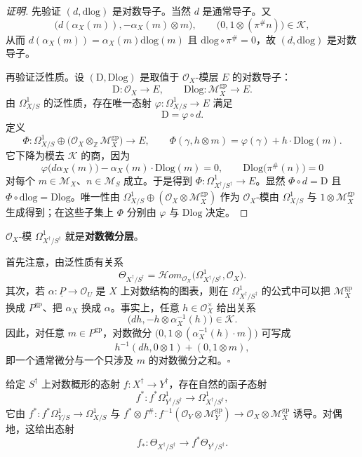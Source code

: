 \begin{proof}[证明]
先验证 $(d,\mathrm{dlog})$ 是对数导子。当然 $d$ 是通常导子。又
\[
  \bigl(d(\alpha_X(m)),-\alpha_X(m)\otimes m\bigr),\qquad
  \bigl(0,1\otimes(\pi^{\#}n)\bigr)\in\mathcal{K},
\]
从而 $d(\alpha_X(m))=\alpha_X(m)\mathrm{dlog}(m)$ 且 $\mathrm{dlog}\circ\pi^{\#}=0$，故 $(d,\mathrm{dlog})$ 是对数导子。

再验证泛性质。设 $(\mathrm{D},\mathrm{Dlog})$ 是取值于 $\mathcal{O}_X$-模层 $E$ 的对数导子：
\[
  \mathrm{D}:\mathcal{O}_X\longrightarrow E,\qquad
  \mathrm{Dlog}:\mathcal{M}_X^{\mathrm{gp}}\longrightarrow E.
\]
由 $\Omega^1_{X/S}$ 的泛性质，存在唯一态射 $\varphi:\Omega^1_{X/S}\to E$ 满足
\[
  \mathrm{D}=\varphi\circ d.
\]
定义
\[
  \Phi:\Omega^1_{X/S}\oplus\bigl(\mathcal{O}_X\otimes_{\mathbb{Z}}\mathcal{M}_X^{\mathrm{gp}}\bigr)
  \longrightarrow E,\qquad
  \Phi(\gamma,h\otimes m)=\varphi(\gamma)+h\cdot\mathrm{Dlog}(m).
\]
它下降为模去 $\mathcal{K}$ 的商，因为
\[
  \varphi\bigl(d\alpha_X(m)\bigr)-\alpha_X(m)\cdot\mathrm{Dlog}(m)=0,\qquad
  \mathrm{Dlog}\bigl(\pi^{\#}(n)\bigr)=0
\]
对每个 $m\in\mathcal{M}_X$、$n\in\mathcal{M}_S$ 成立。于是得到 $\Phi:\Omega^1_{X^{\dagger}/S^{\dagger}}\to E$。显然 $\Phi\circ d=\mathrm{D}$ 且 $\Phi\circ\mathrm{dlog}=\mathrm{Dlog}$。唯一性由 $\Omega^1_{X/S}\oplus(\mathcal{O}_X\otimes\mathcal{M}_X^{\mathrm{gp}})$ 作为 $\mathcal{O}_X$-模由 $\Omega^1_{X/S}$ 与 $1\otimes\mathcal{M}_X^{\mathrm{gp}}$ 生成得到；在这些子集上 $\Phi$ 分别由 $\varphi$ 与 $\mathrm{Dlog}$ 决定。
\end{proof}

$\mathcal{O}_X$-模 $\Omega^1_{X^{\dagger}/S^{\dagger}}$ 就是\textbf{对数微分层}。

\begin{remark}
首先注意，由泛性质有关系
\[
  \Theta_{X^{\dagger}/S^{\dagger}}
  =\mathcal{H}om_{\mathcal{O}_X}\bigl(\Omega^1_{X^{\dagger}/S^{\dagger}},\mathcal{O}_X\bigr).
\]
其次，若 $\alpha:\underline{P}\to\mathcal{O}_U$ 是 $X$ 上对数结构的图表，则在 $\Omega^1_{X^{\dagger}/S^{\dagger}}$ 的公式中可以把 $\mathcal{M}_X^{\mathrm{gp}}$ 换成 $P^{\mathrm{gp}}$、把 $\alpha_X$ 换成 $\alpha$。事实上，任意 $h\in\mathcal{O}_X^{\times}$ 给出关系
\[
  \bigl(dh,-h\otimes\alpha_X^{-1}(h)\bigr)\in\mathcal{K}.
\]
因此，对任意 $m\in P^{\mathrm{gp}}$，对数微分 $\bigl(0,1\otimes(\alpha_X^{-1}(h)\cdot m)\bigr)$ 可写成
\[
  h^{-1}(dh,0\otimes1)+(0,1\otimes m),
\]
即一个通常微分与一个只涉及 $m$ 的对数微分之和。\hfill$\square$
\end{remark}

\begin{definition}
给定 $S^{\dagger}$ 上对数概形的态射 $f:X^{\dagger}\to Y^{\dagger}$，存在自然的函子态射
\[
  f^{*}:f^{*}\Omega^1_{Y^{\dagger}/S^{\dagger}}\longrightarrow\Omega^1_{X^{\dagger}/S^{\dagger}},
\]
它由 $f^{*}:f^{*}\Omega^1_{Y/S}\to\Omega^1_{X/S}$ 与 $f^{*}\otimes f^{\#}:f^{-1}(\mathcal{O}_Y\otimes\mathcal{M}_Y^{\mathrm{gp}})\to\mathcal{O}_X\otimes\mathcal{M}_X^{\mathrm{gp}}$ 诱导。对偶地，这给出态射
\[
  f_{*}:\Theta_{X^{\dagger}/S^{\dagger}}\longrightarrow f^{*}\Theta_{Y^{\dagger}/S^{\dagger}}.
\]
\end{definition}

